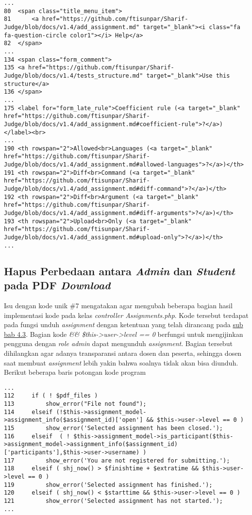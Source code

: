 \begin{lstlisting}[basicstyle=\ttfamily, frame=single,
columns=fullflexible, keepspaces=true, breaklines=true]
...
80	<span class="title_menu_item">
81		<a href="https://github.com/ftisunpar/Sharif-Judge/blob/docs/v1.4/add_assignment.md" target="_blank"><i class="fa fa-question-circle color1"></i> Help</a>
82	</span>
...
134	<span class="form_comment">
135	<a href="https://github.com/ftisunpar/Sharif-Judge/blob/docs/v1.4/tests_structure.md" target="_blank">Use this structure</a>
136	</span>
...
175	<label for="form_late_rule">Coefficient rule (<a target="_blank" href="https://github.com/ftisunpar/Sharif-Judge/blob/docs/v1.4/add_assignment.md#coefficient-rule">?</a>)</label><br>
...
190	<th rowspan="2">Allowed<br>Languages (<a target="_blank" href="https://github.com/ftisunpar/Sharif-Judge/blob/docs/v1.4/add_assignment.md#allowed-languages">?</a>)</th>
191	<th rowspan="2">Diff<br>Command (<a target="_blank" href="https://github.com/ftisunpar/Sharif-Judge/blob/docs/v1.4/add_assignment.md#diff-command">?</a>)</th>
192	<th rowspan="2">Diff<br>Argument (<a target="_blank" href="https://github.com/ftisunpar/Sharif-Judge/blob/docs/v1.4/add_assignment.md#diff-arguments">?</a>)</th>
193	<th rowspan="2">Upload<br>Only (<a target="_blank" href="https://github.com/ftisunpar/Sharif-Judge/blob/docs/v1.4/add_assignment.md#upload-only">?</a>)</th>
...
\end{lstlisting}

	\subsection{Hapus Perbedaan antara \textit{Admin} dan \textit{Student} pada PDF \textit{Download}}
	Isu dengan kode unik \#7 mengatakan agar mengubah beberapa bagian hasil implementasi kode pada kelas \textit{controller Assignments.php}. Kode tersebut terdapat pada fungsi unduh \textit{assignment} dengan ketentuan yang telah dirancang pada \hyperref[chap:batassoal]{sub bab 4.3}. Bagian kode \textit{\&\& \$this->user->level == 0} berfungsi untuk mengijinkan pengguna dengan \textit{role admin} dapat mengunduh \textit{assignment}. Bagian tersebut dihilangkan agar adanya transparansi antara dosen dan peserta, sehingga dosen saat membuat \textit{assignment} lebih yakin bahwa soalnya tidak akan bisa diunduh. Berikut beberapa baris potongan kode program
\begin{lstlisting}[basicstyle=\ttfamily, frame=single,
columns=fullflexible, keepspaces=true, breaklines=true]
...
112		if ( ! $pdf_files )
113			show_error("File not found");
114		elseif (!$this->assignment_model->assignment_info($assignment_id)['open'] && $this->user->level == 0 )
115			show_error('Selected assignment has been closed.');
116		elseif	( ! $this->assignment_model->is_participant($this->assignment_model->assignment_info($assignment_id)['participants'],$this->user->username) )
117			show_error('You are not registered for submitting.');
118		elseif ( shj_now() > $finishtime + $extratime && $this->user->level == 0 )
119			show_error('Selected assignment has finished.');
120		elseif ( shj_now() < $starttime && $this->user->level == 0 )
121			show_error('Selected assignment has not started.');
...
\end{lstlisting}
	

